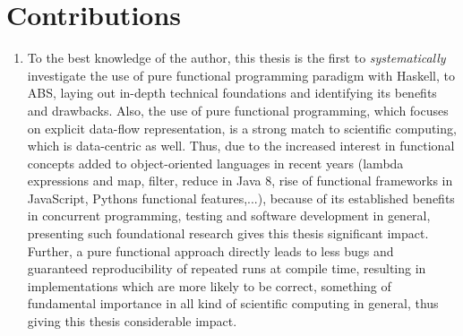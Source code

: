 
\section{Contributions}
\begin{enumerate}
	\item To the best knowledge of the author, this thesis is the first to \textit{systematically} investigate the use of pure functional programming paradigm with Haskell, to ABS, laying out in-depth technical foundations and identifying its benefits and drawbacks. Also, the use of pure functional programming, which focuses on explicit data-flow representation, is a strong match to scientific computing, which is data-centric as well. Thus, due to the increased interest in functional concepts added to object-oriented languages in recent years (lambda expressions and map, filter, reduce in Java 8, rise of functional frameworks in JavaScript, Pythons functional features,...), because of its established benefits in concurrent programming, testing and software development in general, presenting such foundational research gives this thesis significant impact. Further, a pure functional approach directly leads to less bugs and guaranteed reproducibility of repeated runs at compile time, resulting in implementations which are more likely to be correct, something of fundamental importance in all kind of scientific computing in general, thus giving this thesis considerable impact.
	

\end{enumerate}
